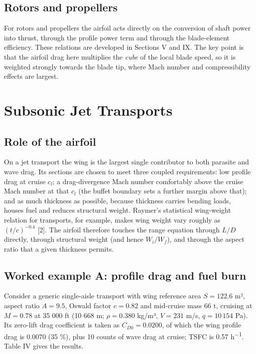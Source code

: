 \documentclass[10pt,a4paper,twocolumn]{article}
\begin{document}
\hypertarget{rotors-and-propellers}{%
\subsection{Rotors and propellers}\label{rotors-and-propellers}}

For rotors and propellers the airfoil acts directly on the conversion of
shaft power into thrust, through the profile power term and through the
blade-element efficiency. These relations are developed in Sections V
and IX. The key point is that the airfoil drag here multiplies the
\emph{cube} of the local blade speed, so it is weighted strongly towards
the blade tip, where Mach number and compressibility effects are
largest.

\hypertarget{subsonic-jet-transports}{%
\section{Subsonic Jet Transports}\label{subsonic-jet-transports}}

\hypertarget{role-of-the-airfoil}{%
\subsection{Role of the airfoil}\label{role-of-the-airfoil}}

On a jet transport the wing is the largest single contributor to both
parasite and wave drag. Its sections are chosen to meet three coupled
requirements: low profile drag at cruise \(c_l\); a drag-divergence Mach
number comfortably above the cruise Mach number at that \(c_l\) (the
buffet boundary sets a further margin above that); and as much thickness
as possible, because thickness carries bending loads, houses fuel and
reduces structural weight. Raymer's statistical wing-weight relation for
transports, for example, makes wing weight vary roughly as
\((t/c)^{-0.4}\) {[}2{]}. The airfoil therefore touches the range
equation through \(L/D\) directly, through structural weight (and hence
\(W_i/W_f\)), and through the aspect ratio that a given thickness
permits.

\hypertarget{worked-example-a-profile-drag-and-fuel-burn}{%
\subsection{Worked example A: profile drag and fuel
burn}\label{worked-example-a-profile-drag-and-fuel-burn}}

Consider a generic single-aisle transport with wing reference area
\(S=122.6\) m², aspect ratio \(A=9.5\), Oswald factor \(e=0.82\) and
mid-cruise mass 66 t, cruising at \(M=0.78\) at 35 000 ft (10 668 m;
\(\rho=0.380\) kg/m³, \(V=231\) m/s, \(q=10\,154\) Pa). Its zero-lift
drag coefficient is taken as \(C_{D0}=0.0200\), of which the wing
profile drag is 0.0070 (35 \%), plus 10 counts of wave drag at cruise;
TSFC is 0.57 h\textsuperscript{−1}. Table IV gives the results.
\end{document}
